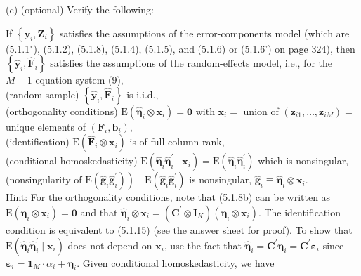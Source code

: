 \documentclass[10pt]{article}
\begin{document}
(c) (optional) Verify the following:

If $\left\{\mathbf{y}_{i}, \mathbf{Z}_{i}\right\}$ satisfies the assumptions of the error-components model (which are (5.1.1"), (5.1.2), (5.1.8), (5.1.4), (5.1.5), and (5.1.6) or (5.1.6') on page 324), then $\left\{\hat{\mathbf{y}}_{i}, \widehat{\mathbf{F}}_{i}\right\}$ satisfies the assumptions of the random-effects model, i.e., for the $M-1$ equation system (9),\\
(random sample) $\left\{\hat{\mathbf{y}}_{i}, \widehat{\mathbf{F}}_{i}\right\}$ is i.i.d.,\\
(orthogonality conditions) $\mathrm{E}\left(\hat{\boldsymbol{\eta}}_{i} \otimes \mathbf{x}_{i}\right)=\mathbf{0}$ with $\mathbf{x}_{i}=$ union of $\left(\mathbf{z}_{i 1}, \ldots, \mathbf{z}_{i M}\right)=$ unique elements of $\left(\mathbf{F}_{i}, \mathbf{b}_{i}\right)$,\\
(identification) $\mathrm{E}\left(\widehat{\mathbf{F}}_{i} \otimes \mathbf{x}_{i}\right)$ is of full column rank,\\
(conditional homoskedasticity) $\mathrm{E}\left(\hat{\boldsymbol{\eta}}_{i} \hat{\boldsymbol{\eta}}_{i}^{\prime} \mid \mathbf{x}_{i}\right)=\mathrm{E}\left(\hat{\boldsymbol{\eta}}_{i} \hat{\boldsymbol{\eta}}_{i}^{\prime}\right)$ which is nonsingular,\\
(nonsingularity of $\left.\mathrm{E}\left(\hat{\mathbf{g}}_{i} \hat{\mathbf{g}}_{i}^{\prime}\right)\right) \quad \mathrm{E}\left(\hat{\mathbf{g}}_{i} \hat{\mathbf{g}}_{i}^{\prime}\right)$ is nonsingular, $\hat{\mathbf{g}}_{i} \equiv \hat{\boldsymbol{\eta}}_{i} \otimes \mathbf{x}_{i}$.\\
Hint: For the orthogonality conditions, note that (5.1.8b) can be written as $\mathrm{E}\left(\boldsymbol{\eta}_{i} \otimes \mathbf{x}_{i}\right)=\mathbf{0}$ and that $\hat{\boldsymbol{\eta}}_{i} \otimes \mathbf{x}_{i}=\left(\mathbf{C}^{\prime} \otimes \mathbf{I}_{K}\right)\left(\boldsymbol{\eta}_{i} \otimes \mathbf{x}_{i}\right)$. The identification condition is equivalent to (5.1.15) (see the answer sheet for proof). To show that $\mathrm{E}\left(\hat{\boldsymbol{\eta}}_{i} \hat{\boldsymbol{\eta}}_{i}^{\prime} \mid \mathbf{x}_{i}\right)$ does not depend on $\mathbf{x}_{i}$, use the fact that $\hat{\boldsymbol{\eta}}_{i}=\mathbf{C}^{\prime} \boldsymbol{\eta}_{i}=\mathbf{C}^{\prime} \boldsymbol{\varepsilon}_{i}$ since $\boldsymbol{\varepsilon}_{i}=\mathbf{1}_{M} \cdot \alpha_{i}+\boldsymbol{\eta}_{i}$. Given conditional homoskedasticity, we have
\end{document}
